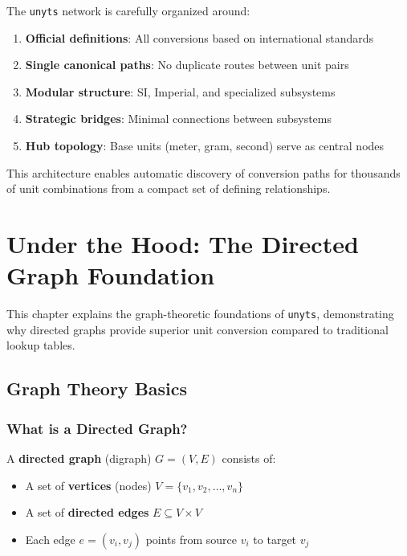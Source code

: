\documentclass[11pt,a4paper]{report}
\begin{document}
The \texttt{unyts} network is carefully organized around:
\begin{enumerate}[leftmargin=*]
  \item \textbf{Official definitions}: All conversions based on international standards
  \item \textbf{Single canonical paths}: No duplicate routes between unit pairs
  \item \textbf{Modular structure}: SI, Imperial, and specialized subsystems
  \item \textbf{Strategic bridges}: Minimal connections between subsystems
  \item \textbf{Hub topology}: Base units (meter, gram, second) serve as central nodes
\end{enumerate}

This architecture enables automatic discovery of conversion paths for thousands of unit combinations from a compact set of defining relationships.


\chapter{Under the Hood: The Directed Graph Foundation}

This chapter explains the graph-theoretic foundations of \texttt{unyts}, demonstrating why directed graphs provide superior unit conversion compared to traditional lookup tables.

\section{Graph Theory Basics}

\subsection{What is a Directed Graph?}

A \textbf{directed graph} (digraph) $G = (V, E)$ consists of:
\begin{itemize}[leftmargin=*]
  \item A set of \textbf{vertices} (nodes) $V = \{v_1, v_2, \ldots, v_n\}$
  \item A set of \textbf{directed edges} $E \subseteq V \times V$
  \item Each edge $e = (v_i, v_j)$ points from source $v_i$ to target $v_j$
\end{itemize}
\end{document}
